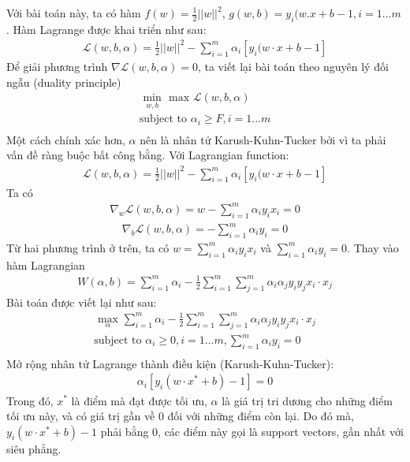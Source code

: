 \documentclass{article}
\begin{document}
	Với bài toán này, ta có hàm $f(w) = \frac{1}{2}||w||^2$, $g(w, b) = y_i(w.x + b - 1, i=1...m$. Hàm Lagrange được khai triển như sau:
	\begin{gather*}
		\mathcal{L}(w, b, \alpha) = \frac{1}{2}||w||^2 - \sum_{i=1}^m\alpha_i[y_i(w \cdot x + b - 1]
	\end{gather*}
	Để giải phương trình $\nabla \mathcal{L}(w, b, \alpha) = 0$, ta viết lại bài toán theo nguyên lý đối ngẫu (duality principle)
	\begin{gather*}
		\underset{w, b}{\text{ min }}\text{ max } \mathcal{L}(w, b, \alpha)\\
		\text{subject to } \alpha_i \geq F, i = 1...m \\
	\end{gather*}
	Một cách chính xác hơn, $\alpha$ nên là nhân tử Karush-Kuhn-Tucker bởi vì ta phải vấn đề ràng buộc bất công bằng.\newline
	Với Lagrangian function: 
	\begin{gather*}
		\mathcal{L}(w, b, \alpha) = \frac{1}{2}||w||^2 - \sum_{i=1}^m\alpha_i[y_i(w \cdot x + b - 1]
	\end{gather*}
	Ta có
	\begin{gather*}
		\nabla_w\mathcal{L}(w, b, \alpha) = w - \sum_{i=1}^m\alpha_iy_ix_i = 0
	\end{gather*}
	\begin{gather*}
		\nabla_b\mathcal{L}(w, b, \alpha) = - \sum_{i=1}^m\alpha_iy_i = 0
	\end{gather*}
	Từ hai phương trình ở trên, ta có $w = \sum_{i=1}^m\alpha_iy_ix_i$ và $\sum_{i=1}^m\alpha_iy_i = 0$. Thay vào hàm Lagrangian
	\begin{gather*}
		W(\alpha, b) = \sum_{i=1}^m\alpha_i - \frac{1}{2}\sum_{i=1}^m\sum_{j=1}^m\alpha_i\alpha_j y_i y_j x_i \cdot x_j
	\end{gather*}
	Bài toán được viết lại như sau:
	\begin{gather*}
		\underset{\alpha}{\text{ max }}\sum_{i=1}^m\alpha_i - \frac{1}{2}\sum_{i=1}^m\sum_{j=1}^m\alpha_i\alpha_j y_i y_j x_i \cdot x_j\\
		\text{subject to } \alpha_i \geq 0, i = 1...m,  \sum_{i=1}^m\alpha_iy_i = 0\\
	\end{gather*}
	Mở rộng nhân tử Lagrange thành điều kiện (Karush-Kuhn-Tucker):
	\begin{gather*}
		\alpha_i[y_i (w \cdot x^{*} + b) - 1] = 0
	\end{gather*}
	Trong đó, $ x^{*}$ là điểm mà đạt được tối ưu, $\alpha$ là giá trị tri dương cho những điểm tối ưu này, và có giá trị gần về 0 đối với những điểm còn lại. Do đó mà, $y_i(w \cdot x^{*} + b) - 1$ phải bằng 0, các điểm này gọi là support vectors, gần nhất với siêu phẳng.\newline
\end{document}
